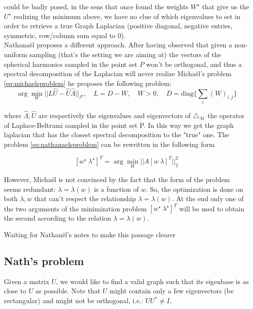 could be badly posed, in the sens that once found the weights $W^\star$ that give us the $U^\star$ realizing the minimum above, we have no clue of which eigenvalues to set in order to retrieve a true Graph Laplacian (positive diagonal, negative entries, symmetric, row/column sum equal to $0$).\\
Nathana\"el proposes a different approach. After having observed that given a non-uniform sampling (that's the setting we are aiming at) the vectors of the spherical harmonics sampled in the point set $P$ won't be orthogonal, and thus a spectral decomposition of the Laplacian will never realize Micha\"el's problem \ref{eq:michaelsproblem} he proposes the following problem:
\begin{equation}\label{eq:nathanaelsproblem}
	\arg\min_W||L\hat U-\hat U\hat \Lambda||_\mathcal F,\quad L=D-W,\quad  W>0,\quad D=\text{diag}\{\sum_{i}(W)_{i,j}\}
\end{equation}

where $\hat{\Lambda}, \hat{U}$ are respectively the eigenvalues and eigenvectors of $\triangle_\mathcal M$ the operator of Laplace-Beltrami sampled in the point set P. In this way we get the graph laplacian that has the closest spectral decomposition to the "true" one. The problem \ref{eq:nathanaelsproblem} can be rewritten in the following form 

\begin{equation}\label{eq:nathanaelsproblem2}
[w^\star\ \lambda^\star]^T = \arg\min_W||A[w\ \lambda]^T||_2^2
\end{equation}

However, Micha\"el is not convinced by the fact that the form of the problem seems redundant: $\lambda=\lambda(w)$ is a function of $w$. So, the optimization is done on both $\lambda, w$ that can't respect the relationship $\lambda=\lambda(w)$. At the end only one of the two arguments of the minimization problem $[w^\star\ \lambda^\star]^T$ will be used to obtain the second according to the relation $\lambda=\lambda(w)$.

Waiting for Nathan\"el's notes to make this passage clearer


\subsection{Nath's problem}

Given a matrix $U$, we would like to find a valid graph such that
its eigenbase is as close to $U$ as possible. Note that $U$ might
contain only a few eigenvectors (be rectangular) and might not be
orthogonal, i.e.: $UU^{*}\neq I$.

